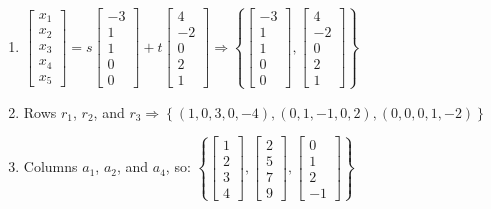 \documentclass[12pt]{article}
\begin{document}
\begin{enumerate}
\begin{enumerate}
      \item $\begin{bmatrix} x_1\\x_2\\x_3\\x_4\\x_5\end{bmatrix}=s\begin{bmatrix}-3\\1\\1\\0\\0\end{bmatrix}+t\begin{bmatrix}4\\-2\\0\\2\\1\end{bmatrix}\Rightarrow\left\{ \begin{bmatrix}-3\\1\\1\\0\\0\end{bmatrix},\begin{bmatrix}4\\-2\\0\\2\\1\end{bmatrix}  \right\}$

      \item Rows $r_1$, $r_2$, and $r_3\Rightarrow\left\{ (1,0,3,0,-4),(0,1,-1,0,2),(0,0,0,1,-2) \right\}$

      \item Columns $a_1$, $a_2$, and $a_4$, so: $\left\{ \begin{bmatrix} 1\\2\\3\\4  \end{bmatrix},\begin{bmatrix}2\\5\\7\\9 \end{bmatrix},\begin{bmatrix}0\\1\\2\\-1 \end{bmatrix} \right\}$


\end{enumerate}
\end{enumerate}
\end{document}
